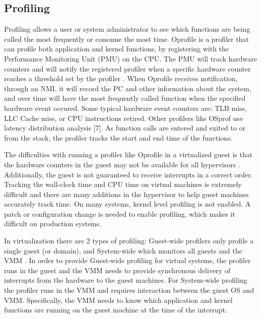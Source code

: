 \subsection{Profiling}
Profiling allows a user or system administrator to see which functions are being called the most frequently or consume the most time.  Oprofile \cite{levon} is a profiler that can profile both application and kernel functions, by registering with the Performance Monitoring Unit (PMU) on the CPU.  The PMU will track hardware counters and will notify the registered profiler when a specific hardware counter reaches a threshold set by the profiler \cite{mucci}.  When Oprofile receives notification, through an NMI, it will record the PC and other information about the system, and over time will have the most frequently called function when the specified hardware event occured.  Some typical hardware event counters are:  TLB miss, LLC Cache miss, or CPU instructions retired.   Other profilers like OSprof use latency distribution analysis [7].  As function calls are entered and exited to or from the stack, the profiler tracks the start and end time of the functions.


\indent The difficulties with running a profiler like Oprofile in a virtualized guest is that the hardware counters in the guest may not be available for all hypervisors \cite{buell1}.  Additionally, the guest is not guaranteed to receive interrupts in a correct order.   Tracking the wall-clock time and CPU time on virtual machines is extremely difficult and there are many additions in the hypervisor to help guest machines accurately track time.  On many systems, kernel level profiling is not enabled. A patch or configuration change is needed to enable profiling, which makes it difficult on production systems.

\indent In virtualization there are 2 types of profiling:  Guest-wide profilers only profile a single guest (or domain), and System-wide which monitors all guests and the VMM \cite{du1}.  In order to provide Guest-wide profiling for virtual systems, the profiler runs in the guest and the VMM needs to provide synchronous delivery of interrupts from the hardware to the guest machines.  For System-wide profiling the profiler runs in the VMM and requires interaction between the guest OS and VMM.  Specifically, the VMM needs to know which application and kernel functions are running on the guest machine at the time of the interrupt.

